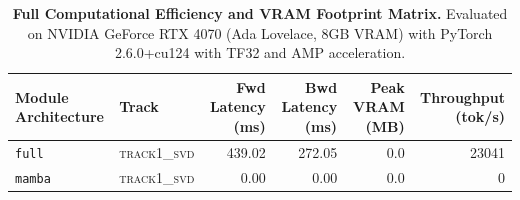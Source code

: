 \begin{table}[t]
\centering
\small
\caption{\textbf{Full Computational Efficiency and VRAM Footprint Matrix.} Evaluated on NVIDIA GeForce RTX 4070 (Ada Lovelace, 8GB VRAM) with PyTorch 2.6.0+cu124 with TF32 and AMP acceleration.}
\label{tab:efficiency_benchmark_results}
\begin{tabular}{l l r r r r}
\toprule
\textbf{Module Architecture} & \textbf{Track} & \textbf{Fwd Latency (ms)} & \textbf{Bwd Latency (ms)} & \textbf{Peak VRAM (MB)} & \textbf{Throughput (tok/s)} \\
\midrule
\texttt{full} & \textsc{track1\_svd} & 439.02 & 272.05 & 0.0 & 23041 \\
\texttt{mamba} & \textsc{track1\_svd} & 0.00 & 0.00 & 0.0 & 0 \\
\bottomrule
\end{tabular}
\end{table}